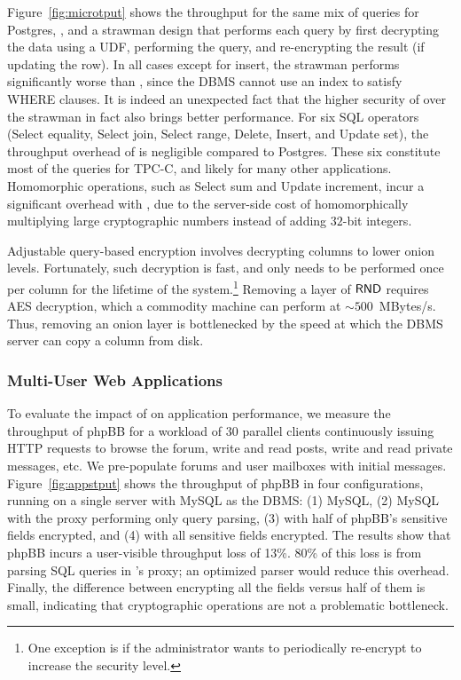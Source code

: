 Figure~\ref{fig:microtput} shows the throughput for the same mix of
queries for Postgres, \name, and a strawman design that performs each
query by first decrypting the data using a UDF, performing the query,
and re-encrypting the result (if updating the row).  In all cases
except for insert, the strawman performs significantly worse than
\name, since the DBMS cannot use an index to satisfy WHERE clauses. It
is indeed an unexpected fact that the higher security of \name{} over
the strawman in fact also brings better performance. For six SQL
operators (Select equality, Select join, Select range, Delete, Insert,
and Update set), the throughput overhead of \name is negligible
compared to Postgres.  These six constitute most of the queries for
TPC-C, and likely for many other applications.  Homomorphic
operations, such as Select sum and Update increment, incur a
significant overhead with \name, due to the server-side cost of
homomorphically multiplying large cryptographic numbers instead of
adding $32$-bit integers.





Adjustable query-based encryption involves decrypting columns to lower
onion levels.  Fortunately, such decryption is fast, and only needs to be
performed once per column for the lifetime of the system.\footnote{One
exception is if the administrator wants to periodically re-encrypt to
increase the security level.}  Removing a layer of $\mathsf{RND}$ requires AES
decryption, which a commodity machine can perform at $\sim 500$~MBytes/s.
Thus, removing an onion layer is bottlenecked by the speed at which the
DBMS server can copy a column from disk.


\subsubsection{Multi-User Web Applications}
\label{s:evalapps}

To evaluate the impact of \name{} on application performance, we
measure the throughput of phpBB for a workload of 30 parallel clients
continuously issuing HTTP requests to browse the forum, write and read
posts, write and read private messages, etc.  We pre-populate forums
and user mailboxes with initial messages.  Figure~\ref{fig:appstput}
shows the throughput of phpBB in four configurations, running on a
single server with MySQL as the DBMS: (1) MySQL, (2) MySQL with the
proxy performing only query parsing, (3) \name with half of phpBB's
sensitive fields encrypted, and (4) \name with all sensitive fields
encrypted.  The results show that phpBB incurs a user-visible
throughput loss of 13\%.  80\% of this loss is from parsing SQL
queries in \name's proxy; an optimized parser would reduce this
overhead.  Finally, the difference between encrypting all the fields
versus half of them is small, indicating that cryptographic operations
are not a problematic bottleneck.

